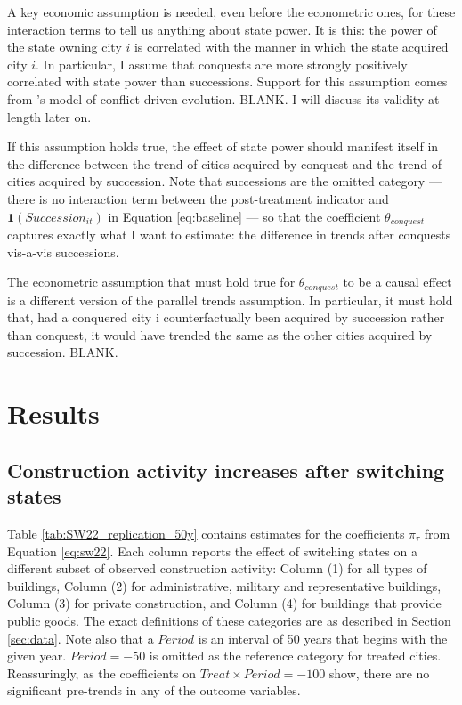 \documentclass[11pt, a4paper]{article}
\begin{document}
A key economic assumption is needed, even before the econometric ones, for these interaction terms to tell us anything about state power. It is this: the power of the state owning city $i$ is correlated with the manner in which the state acquired city $i$. In particular, I assume that conquests are more strongly positively correlated with state power than successions. Support for this assumption comes from \cite{levine2021}'s model of conflict-driven evolution. BLANK. I will discuss its validity at length later on.

If this assumption holds true, the effect of state power should manifest itself in the difference between the trend of cities acquired by conquest and the trend of cities acquired by succession. Note that successions are the omitted category --- there is no interaction term between the post-treatment indicator and $\mathbf{1}(Succession_{it})$ in Equation \eqref{eq:baseline} --- so that the coefficient $\theta_{conquest}$ captures exactly what I want to estimate: the difference in trends after conquests vis-a-vis successions.

The econometric assumption that must hold true for $\theta_{conquest}$ to be a causal effect is a different version of the parallel trends assumption. In particular, it must hold that, had a conquered city i counterfactually been acquired by succession rather than conquest, it would have trended the same as the other cities acquired by succession. BLANK.



\section{Results} \label{sec:results}

\subsection{Construction activity increases after switching states}

Table \ref{tab:SW22_replication_50y} contains estimates for the coefficients $\pi_\tau$ from Equation \eqref{eq:sw22}. Each column reports the effect of switching states on a different subset of observed construction activity: Column (1) for all types of buildings, Column (2) for administrative, military and representative buildings, Column (3) for private construction, and Column (4) for buildings that provide public goods. The exact definitions of these categories are as described in Section \ref{sec:data}. Note also that a $Period$ is an interval of 50 years that begins with the given year. $Period = -50$ is omitted as the reference category for treated cities. Reassuringly, as the coefficients on $Treat \times Period = -100$ show, there are no significant pre-trends in any of the outcome variables. 
\end{document}
